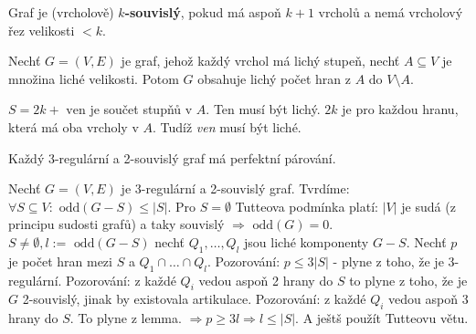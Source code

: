 \begin{definice}
	Graf je (vrcholově) \textbf{$k$-souvislý}, pokud má aspoň $k+1$ vrcholů a nemá vrcholový řez velikosti $< k$.
\end{definice}

\begin{lemma}
	Nechť $G = (V,E)$ je graf, jehož každý vrchol má lichý stupeň, nechť $A \subseteq V$ je množina liché velikosti. Potom $G$ obsahuje lichý počet hran z $A$ do $V \setminus A$.
\end{lemma}

\begin{dukaz}
	$S = 2k + \text{ ven}$ je součet stupňů v $A$. Ten musí být lichý. $2k$ je pro každou hranu, která má oba vrcholy v $A$. Tudíž \textit{ven} musí být liché.
\end{dukaz}

\begin{veta}[Petersen]
	Každý 3-regulární a 2-souvislý graf má perfektní párování.
\end{veta}

\begin{dukaz}
	Nechť $G = (V,E)$ je 3-regulární a 2-souvislý graf. Tvrdíme: $\forall S \subseteq V: \text{ odd}(G-S) \leq |S|$. Pro $S = \emptyset$ Tutteova podmínka platí: $|V|$ je sudá (z principu sudosti grafů) a taky souvislý $\Rightarrow \text{ odd}(G)=0$. $S \neq \emptyset, l := \text{ odd}(G-S)$ nechť $Q_{1},\dots,Q_{l}$ jsou liché komponenty $G-S$. Nechť $p$ je počet hran mezi $S$ a $Q_{1} \cap \dots \cap Q_{l}$. Pozorování: $p \leq 3|S|$ - plyne z toho, že je 3-regulární. Pozorování: z každé $Q_{i}$ vedou aspoň 2 hrany do $S$ to plyne z toho, že je $G$ 2-souvislý, jinak by existovala artikulace. Pozorování: z každé $Q_{i}$ vedou aspoň 3 hrany do $S$. To plyne z lemma. $\Rightarrow p \geq 3l \Rightarrow l \leq |S|$. A ještš použít Tutteovu větu.
\end{dukaz}